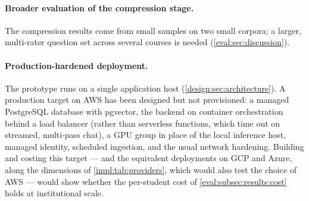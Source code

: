 \paragraph{Broader evaluation of the compression stage.} The compression
results come from small samples on two small corpora; a larger, multi-rater
question set across several courses is needed
(\autoref{eval:sec:discussion}).

\paragraph{Production-hardened deployment.} The prototype runs on a single
application host (\autoref{design:sec:architecture}). A production target on
AWS has been designed but not provisioned: a managed PostgreSQL database with
pgvector, the backend on container orchestration behind a load balancer
(rather than serverless functions, which time out on streamed, multi-pass
chat), a GPU group in place of the local inference host, managed identity,
scheduled ingestion, and the usual network hardening. Building and costing
this target --- and the equivalent deployments on GCP and Azure, along the
dimensions of \autoref{impl:tab:providers}, which would also test the choice
of AWS --- would show whether the per-student cost of
\autoref{eval:subsec:results:cost} holds at institutional scale.

